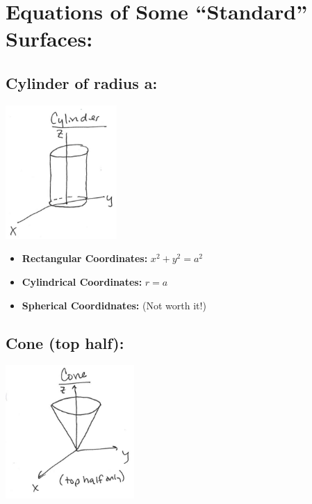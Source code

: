 \pagebreak
\section*{Equations of Some ``Standard'' Surfaces:}



\subsection*{Cylinder of radius a:}
\includegraphics[height=2in]{Ch12s7-Cylinder.png}


\begin{itemize}
\item \textbf{Rectangular Coordinates:} \(x^2+y^2=a^2\)
\item \textbf{Cylindrical Coordinates:} \(r=a\)
\item \textbf{Spherical Coordidnates:} (Not worth it!)
\end{itemize}


\subsection*{Cone (top half):}
\includegraphics[height=2in]{Ch12s7-Cone.png}

